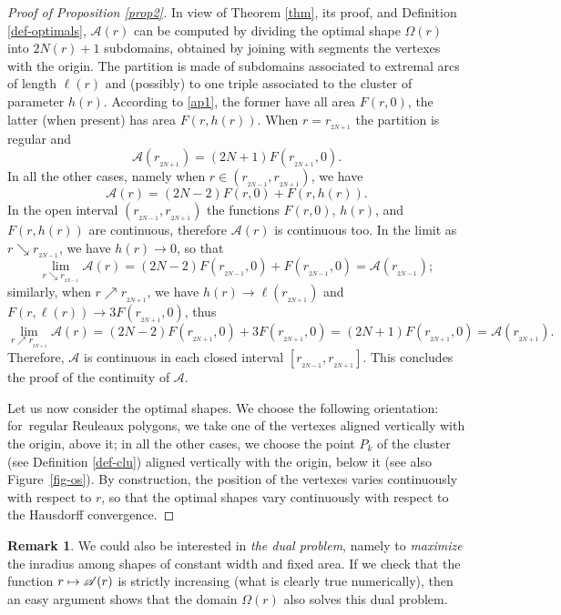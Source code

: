 \documentclass[JEP,XML,SOM,Unicode,NoFloatCountersInSection]{cedram}
\let\mathcal\mathscr
\newcommand\mto{\mathchoice{\longmapsto}{\mapsto}{\mapsto}{\mapsto}}
\theoremstyle{plain}
\theoremstyle{definition}
\newtheorem{remark}[theorem]{Remark}
\newcommand\A{\mathcal A}
\renewcommand\r{r_{_{2N+1}}}
\begin{document}
\begin{proof}[Proof of Proposition \ref{prop2}] In view of Theorem \ref{thm}, its proof, and Definition \ref{def-optimals}, $\A(r)$ can be computed by dividing the optimal shape $\Omega(r)$ into $2N(r)+1$ subdomains, obtained by joining with segments the vertexes with the origin. The partition is made of subdomains associated to extremal arcs of length $\ell(r)$ and (possibly) to one triple associated to the cluster of parameter $h(r)$. According to \eqref{ap1}, the former have all area $F(r,0)$, the latter (when present) has area $F(r,h(r))$.
When $r=\r$ the partition is regular and
\[
\A(\r) = (2N+1)F(\r,0).
\]
In all the other cases, namely when $r\in (r_{_{2N-1}},\r)$, we have
\[
\A(r)=(2N-2)F(r,0) + F(r,h(r)).
\]
In the open interval $(r_{_{2N-1}}, \r)$ the functions $F(r,0)$, $h(r)$, and $F(r,h(r))$ are continuous, therefore $\A(r)$ is continuous too. In the limit as $r \searrow r_{_{2N-1}}$, we have $h(r)\to 0$, so that
\[
\lim_{r\searrow r_{_{2N-1}}}\A(r)= (2N-2)F(r_{_{2N-1}},0) + F(r_{_{2N-1}},0) = \A(r_{_{2N-1}});
\]
similarly, when $r\nearrow \r$, we have $h(r)\to\ell(\r)$ and $F(r,\ell(r))\to 3 F(\r,0)$, thus
\[
\lim_{r\nearrow \r}\A(r)=(2N-2)F(\r,0) + 3F(\r,0)=(2N+1)F(\r,0) = \A(\r).
\]
Therefore, $\A$ is continuous in each closed interval $[r_{_{2N-1}},\r]$. This concludes the proof of the continuity of $\A$.

Let us now consider the optimal shapes. We choose the following orientation: for~regular Reuleaux polygons, we take one of the vertexes aligned vertically with the origin, above it; in all the other cases, we choose the point $P_k$ of the cluster (see Definition \ref{def-clu}) aligned vertically with the origin, below it (see also Figure~\ref{fig-os}). By construction, the position of the vertexes varies continuously with respect to $r$, so that the optimal shapes vary continuously with respect to the Hausdorff convergence.
\end{proof}

\begin{remark}
We could also be interested in \emph{the dual problem}, namely to \emph{maximize} the inradius among shapes of constant width and fixed area. If we check that the function $r\mto \A(r)$ is strictly increasing
(what is clearly true numerically), then an easy argument shows that the domain $\Omega(r)$ also
solves this dual problem.
\end{remark}

\backmatter


\end{document}
